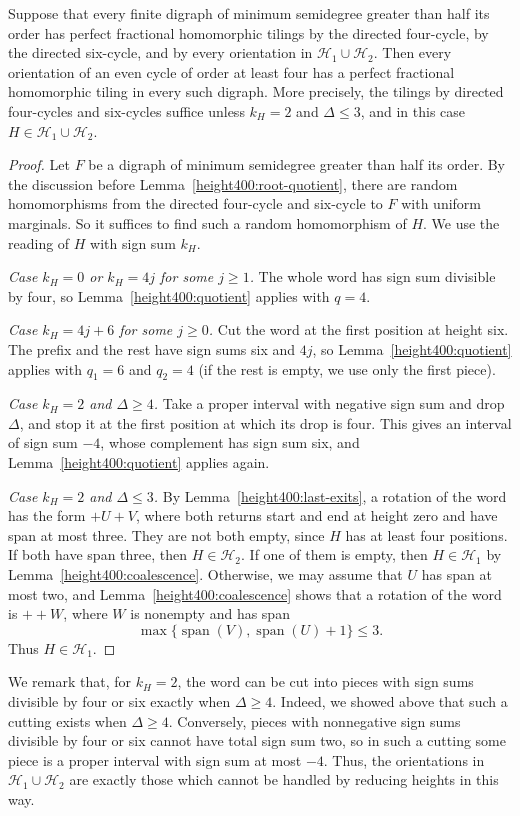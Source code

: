 \begin{lemma}
\label{compact390:structural-reduction}
Suppose that every finite digraph of minimum semidegree greater
than half its order has perfect fractional homomorphic tilings by
the directed four-cycle, by the directed six-cycle, and by every orientation in $\mathcal H_1\cup\mathcal H_2$.
Then every orientation of an even cycle of order at least four
has a perfect fractional homomorphic tiling in every such digraph.
More precisely, the tilings by directed four-cycles and six-cycles suffice unless $k_H=2$ and
$\Delta\le3$, and in this case $H\in\mathcal H_1\cup\mathcal H_2$.
\end{lemma}
\begin{proof}
Let $F$ be a digraph of minimum semidegree greater than half its order. By the discussion before Lemma~\ref{height400:root-quotient}, there are random homomorphisms from the directed four-cycle and six-cycle to $F$ with uniform marginals. So it suffices to find such a random homomorphism of $H$. We use the reading of $H$ with sign sum $k_H$.

\emph{Case $k_H=0$ or $k_H=4j$ for some $j\ge1$.}
The whole word has sign sum divisible by four, so Lemma~\ref{height400:quotient} applies with $q=4$.

\emph{Case $k_H=4j+6$ for some $j\ge0$.}
Cut the word at the first position at height six. The prefix and the rest have sign sums six and $4j$, so Lemma~\ref{height400:quotient} applies with $q_1=6$ and $q_2=4$ (if the rest is empty, we use only the first piece).

\emph{Case $k_H=2$ and $\Delta\ge4$.}
Take a proper interval with negative sign sum and drop $\Delta$, and stop it at the first position at which its drop is four. This gives an interval of sign sum $-4$, whose complement has sign sum six, and Lemma~\ref{height400:quotient} applies again.

\emph{Case $k_H=2$ and $\Delta\le3$.} By Lemma~\ref{height400:last-exits}, a rotation of the word has the form $+U+V$, where both returns start and end at height zero and have
span at most three. They are not both empty, since $H$ has at least four positions. If both have span three, then $H\in\mathcal H_2$. If one of them is empty, then $H\in\mathcal H_1$ by Lemma~\ref{height400:coalescence}. Otherwise, we may assume that $U$ has span at most two, and Lemma~\ref{height400:coalescence} shows that a rotation of the word is $++W$, where $W$ is nonempty and has span
\[
 \max\{\operatorname{span}(V),\operatorname{span}(U)+1\}\le3.
\]
Thus $H\in\mathcal H_1$.
\end{proof}

We remark that, for $k_H=2$, the word can be cut into pieces with sign sums divisible by four or six exactly when $\Delta\ge4$. Indeed, we showed above that such a cutting exists when $\Delta\ge4$. Conversely, pieces with nonnegative sign sums divisible by four or six cannot have total sign sum two, so in such a cutting some piece is a proper interval with sign sum at most $-4$.
Thus, the orientations in $\mathcal H_1\cup\mathcal H_2$ are exactly those which cannot be handled by reducing heights in this way.

